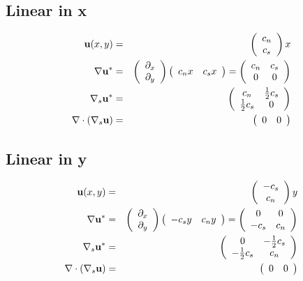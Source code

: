 \documentclass[11pt]{report}
\begin{document}
\subsection{Linear in x\label{linear_x}}
\begin{eqnarray}
{\bf u}(x,y) &=& \left( \begin{array}{c} c_n \\ c_s \end{array}   \right)x \\
\nabla{\bf u}^* &=& \left( \begin{array}{c} \partial_x \\ \partial_y \end{array}   \right) \left( \begin{array}{cc} c_nx & c_sx \end{array}   \right)
 =  \left( \begin{array}{cc} c_n & c_s \\ 0 & 0 \end{array}   \right) \\
\nabla_s{\bf u}^* &=&  \left( \begin{array}{cc} c_n & \frac{1}{2}c_s \\ \frac{1}{2}c_s & 0 \end{array}   \right) \\
\nabla\cdot\left(\nabla_s{\bf u}\right) &=&  \left( \begin{array}{cc} 0 & 0 \end{array}   \right)
\end{eqnarray}

\subsection{Linear in y\label{linear_y}}
\begin{eqnarray}
{\bf u}(x,y) &=& \left( \begin{array}{c} -c_s \\ c_n \end{array}   \right)y \\
\nabla{\bf u}^* &=& \left( \begin{array}{c} \partial_x \\ \partial_y \end{array}   \right) \left( \begin{array}{cc} -c_sy & c_ny \end{array}   \right)
 =  \left( \begin{array}{cc}  0 & 0 \\ -c_s & c_n  \end{array}   \right) \\
\nabla_s{\bf u}^* &=&  \left( \begin{array}{cc} 0 & -\frac{1}{2}c_s \\ -\frac{1}{2}c_s & c_n \end{array}   \right) \\
\nabla\cdot\left(\nabla_s{\bf u}\right) &=&  \left( \begin{array}{cc} 0 & 0 \end{array}   \right)
\end{eqnarray}
\end{document}
